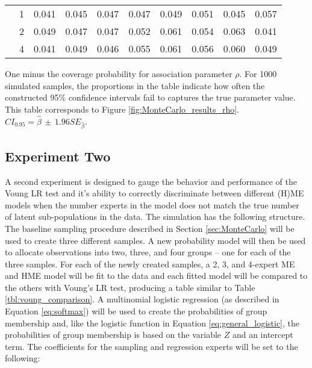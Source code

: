 \documentclass[12pt]{article}
\theoremstyle{definition}
\begin{document}
\begin{table}[b!]
\begin{threeparttable}
{\begin{tabular}[r]{l l r r r r r r r r}
          &     1 & 0.041 & 0.045 & 0.047 & 0.047 & 0.049 & 0.051 & 0.045 & 0.057 \\
          &     2 & 0.049 & 0.047 & 0.047 & 0.052 & 0.061 & 0.054 & 0.063 & 0.041 \\
          &     4 & 0.041 & 0.049 & 0.046 & 0.055 & 0.061 & 0.056 & 0.060 & 0.049 \\
  \hline
    \end{tabular}
    }
    \begin{tablenotes}
      \item{\footnotesize One minus the coverage probability for association  parameter $\rho$. For 1000 simulated samples, the proportions in the table indicate how often the constructed 95\% confidence intervals fail to captures the true parameter value. This table corresponds to Figure \ref{fig:MonteCarlo_results_rho}. $CI_{0.95} = \hat\beta \, \pm \, 1.96 SE_{\hat{\beta}}$.}
    \end{tablenotes} \label{tbl:coverage_ratio_rho}
  \end{threeparttable}
\end{table}


\clearpage

\subsection{Experiment Two} \label{subsec:ExperimentTwo}

A second experiment is designed to gauge the behavior and performance of the Voung LR test and it's ability to correctly discriminate between different (H)ME models when the number experts in the model does not match the true number of latent sub-populations in the data. The simulation has the following structure. The baseline sampling procedure described in Section \ref{sec:MonteCarlo} will be used to create three different samples. A new probability model will then be used to allocate observations into two, three, and four groups -- one for each of the three samples. For each of the newly created samples, a 2, 3, and 4-expert ME and HME model will be fit to the data and each fitted model will be compared to the others with Voung's LR test, producing a table similar to Table \ref{tbl:voung_comparison}. A multinomial logistic regression (as described in Equation \ref{eq:softmax}) will be used to create the probabilities of group membership and, like the logistic function in Equation \ref{eq:general_logistic}, the probabilities of group membership is based on the variable $Z$ and an intercept term. The coefficients for the sampling and regression experts will be set to the following: 
\end{document}
